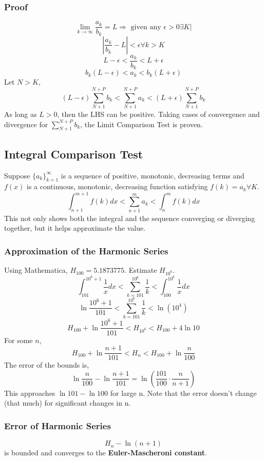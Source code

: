 \documentclass[../main.tex]{subfiles}
\begin{document}
        \subsubsection{Proof}
            $$\lim_{k\rightarrow\infty}\frac{a_{k}}{b_{k}}=L\Rightarrow\text{ given any }\epsilon>0\exists K |$$
            $$|\frac{a_{k}}{b_{k}}-L|<\epsilon \forall k > K$$
            $$L-\epsilon<\frac{a_{k}}{b_{k}}<L+\epsilon$$
            $$b_{k}(L-\epsilon)<a_{k}<b_{k}(L+\epsilon)$$
            Let $N > K$,
            $$(L-\epsilon)\sum_{N+1}^{N+P}b_{k}<\sum_{N+1}^{N+P}a_{k}<(L+\epsilon)\sum_{N+1}^{N+P}b_{k}$$
            As long as $L>0$, then the LHS can be positive. Taking cases of convergence and divergence for $\sum_{N+1}^{N+P}b_{k}$,
            the Limit Comparison Test is proven.

    \subsection{Integral Comparison Test}
        Suppose $\{a_{k}\}_{k=1}^{\infty}$ is a sequence of positive, monotonic, decreasing terms
        and $f(x)$ is a continuous, monotonic, decreasing function satisfying $f(k)=a_{k} \forall K$.
        $$\int_{n+1}^{m+1}f(k)dx<\sum_{n+1}^{m}a_{k}<\int_{n}^{m}f(k)dx$$
        This not only shows both the integral and the sequence converging or diverging together, but it helps
        approximate the value.
        
        \subsubsection{Approximation of the Harmonic Series}
            Using Mathematica, $H_{100}=5.1873775$. Estimate $H_{10^{6}}$.
            $$\int_{101}^{10^{6}+1}\frac{1}{x}dx<\sum_{k=101}^{10^{6}}\frac{1}{k}<\int_{100}^{10^{6}}\frac{1}{x}dx$$
            $$\ln\frac{10^{6}+1}{101}<\sum_{k=101}^{10^{6}}\frac{1}{k}<\ln(10^{4})$$
            $$H_{100}+\ln\frac{10^{6}+1}{101}<H_{10^{6}}<H_{100}+4\ln10$$
            For some $n$,
            $$H_{100}+\ln\frac{n+1}{101}<H_{n}<H_{100}+\ln\frac{n}{100}$$
            The error of the bounds is,
            $$\ln\frac{n}{100}-\ln\frac{n+1}{101}=\ln\left(\frac{101}{100}\cdot\frac{n}{n+1}\right)$$
            This approaches $\ln101 - \ln100$ for large n. Note that the error doesn't change (that much) for significant changes in n.

        \subsubsection{Error of Harmonic Series}
            $$H_{n}-\ln(n+1)$$
            is bounded and converges to the \textbf{Euler-Mascheroni constant}.
\end{document}
